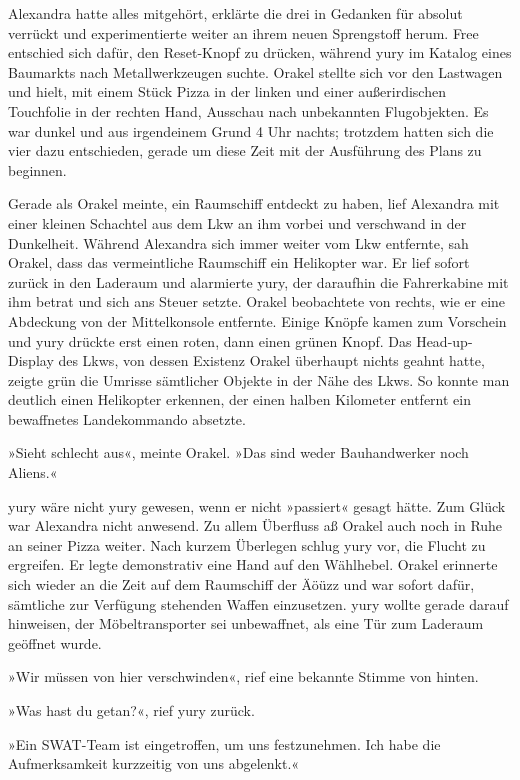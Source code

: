 Alexandra hatte alles mitgehört, erklärte die drei in Gedanken für absolut verrückt und experimentierte weiter an ihrem neuen Sprengstoff herum. Free entschied sich dafür, den Reset-Knopf zu drücken, während yury im Katalog eines Baumarkts nach Metallwerkzeugen suchte. Orakel stellte sich vor den Lastwagen und hielt, mit einem Stück Pizza in der linken und einer außerirdischen Touchfolie in der rechten Hand, Ausschau nach unbekannten Flugobjekten. Es war dunkel und aus irgendeinem Grund 4 Uhr nachts; trotzdem hatten sich die vier dazu entschieden, gerade um diese Zeit mit der Ausführung des Plans zu beginnen.

Gerade als Orakel meinte, ein Raumschiff entdeckt zu haben, lief Alexandra mit einer kleinen Schachtel aus dem Lkw an ihm vorbei und verschwand in der Dunkelheit. Während Alexandra sich immer weiter vom Lkw entfernte, sah Orakel, dass das vermeintliche Raumschiff ein Helikopter war. Er lief sofort zurück in den Laderaum und alarmierte yury, der daraufhin die Fahrerkabine mit ihm betrat und sich ans Steuer setzte. Orakel beobachtete von rechts, wie er eine Abdeckung von der Mittelkonsole entfernte. Einige Knöpfe kamen zum Vorschein und yury drückte erst einen roten, dann einen grünen Knopf. Das Head-up-Display des Lkws, von dessen Existenz Orakel überhaupt nichts geahnt hatte, zeigte grün die Umrisse sämtlicher Objekte in der Nähe des Lkws. So konnte man deutlich einen Helikopter erkennen, der einen halben Kilometer entfernt ein bewaffnetes Landekommando absetzte.

»Sieht schlecht aus«, meinte Orakel. »Das sind weder Bauhandwerker noch Aliens.«

yury wäre nicht yury gewesen, wenn er nicht »passiert« gesagt hätte. Zum Glück war Alexandra nicht anwesend. Zu allem Überfluss aß Orakel auch noch in Ruhe an seiner Pizza weiter. Nach kurzem Überlegen schlug yury vor, die Flucht zu ergreifen. Er legte demonstrativ eine Hand auf den Wählhebel. Orakel erinnerte sich wieder an die Zeit auf dem Raumschiff der Äöüzz und war sofort dafür, sämtliche zur Verfügung stehenden Waffen einzusetzen. yury wollte gerade darauf hinweisen, der Möbeltransporter sei unbewaffnet, als eine Tür zum Laderaum geöffnet wurde.

»Wir müssen von hier verschwinden«, rief eine bekannte Stimme von hinten.

»Was hast du getan?«, rief yury zurück.

»Ein SWAT-Team ist eingetroffen, um uns festzunehmen. Ich habe die Aufmerksamkeit kurzzeitig von uns abgelenkt.«

